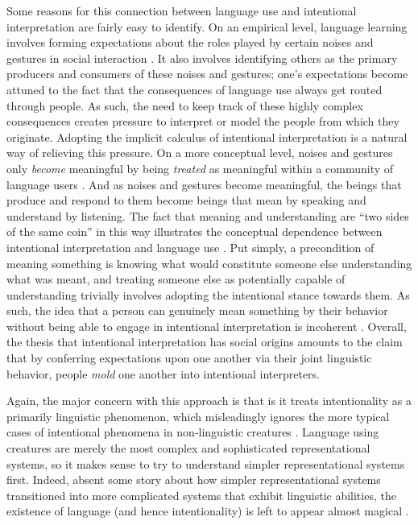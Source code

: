 Some reasons for this connection between language use and intentional interpretation are fairly easy to identify. On an empirical level, language learning involves forming expectations about the roles played by certain noises and gestures in social interaction \citep{Tomasello:2005,Tomasello:2003}. It also involves identifying others as the primary producers and consumers of these noises and gestures; one's expectations become attuned to the fact that the consequences of language use always get routed through people. As such, the need to keep track of these highly complex consequences creates pressure to interpret or model the people from which they originate. Adopting the implicit calculus of intentional interpretation is a natural way of relieving this pressure. On a more conceptual level, noises and gestures only \textit{become} meaningful by being \textit{treated} as meaningful within a community of language users \citep{Brandom:1994}. And as noises and gestures become meaningful, the beings that produce and respond to them become beings that mean by speaking and understand by listening. The fact that meaning and understanding are ``two sides of the same coin'' in this way illustrates the conceptual dependence between intentional interpretation and language use \citep[][p. 89]{Brandom:1994}. Put simply, a precondition of meaning something is knowing what would constitute someone else understanding what was meant, and treating someone else as potentially capable of understanding trivially involves adopting the intentional stance towards them. As such, the idea that a person can genuinely mean something by their behavior without being able to engage in intentional interpretation is incoherent \citep{Brandom:1994}. Overall, the thesis that intentional interpretation has social origins amounts to the claim that by conferring expectations upon one another via their joint linguistic behavior, people \textit{mold} one another into intentional interpreters. 

Again, the major concern with this approach is that is it treats intentionality as a primarily linguistic phenomenon, which misleadingly ignores the more typical cases of intentional phenomena in non-linguistic creatures \citep{Eliasmith:2000,Dennett:1987,Dennett:2010,Millikan:1989,Millikan:2005,Dretske:1986}. Language using creatures are merely the most complex and sophisticated representational systems, so it makes sense to try to understand simpler representational systems first. Indeed, absent some story about how simpler representational systems transitioned into more complicated systems that exhibit linguistic abilities, the existence of language (and hence intentionality) is left to appear almost magical \citep{Dennett:2010}. 

